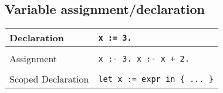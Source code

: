 \documentclass[a4paper,12pt]{article}
\makeatletter
\newcommand{\code}{\lstinline}
\newcommand{\br}{\\ [0.5em] \hline \\ [-0.5em]}
\newenvironment{data}
    {
        \begin{center}
        \begin{tabular*}{\textwidth}{ l@{\extracolsep{\fill}}l }
    }
    {
        \end{tabular*}
        \end{center}
    }
\makeatother
\begin{document}
        \subsection{Variable assignment/declaration}
            \begin{data}
                Declaration        & 
                    \code|x := 3.|             \br
                Assignment         & 
                    \code|x :- 3. x :- x + 2.| \br
                Scoped Declaration & 
                    \code|let x := expr in { ... }|
            \end{data}


    \newpage
    
    
\end{document}
